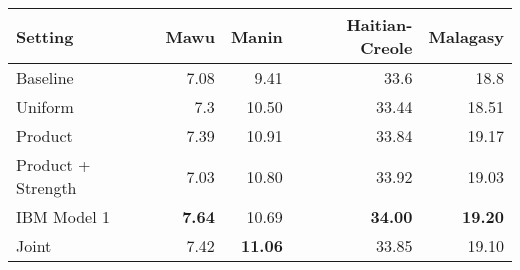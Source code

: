 \begin{tabular}{lrrrr}
\toprule
Setting & Mawu & Manin & Haitian-Creole & Malagasy \\
\toprule
Baseline & 7.08 & 9.41 & 33.6 & 18.8 \\
Uniform & 7.3 & 10.50 & 33.44 & 18.51 \\ 
\midrule
Product & 7.39 & 10.91 & 33.84 & 19.17 \\
Product + Strength & 7.03  & 10.80 & 33.92 & 19.03 \\
IBM Model 1 & \textbf{7.64} & 10.69 & \textbf{34.00} & \textbf{19.20} \\
Joint & 7.42 & \textbf{11.06} & 33.85 & 19.10 \\
\bottomrule
\end{tabular}